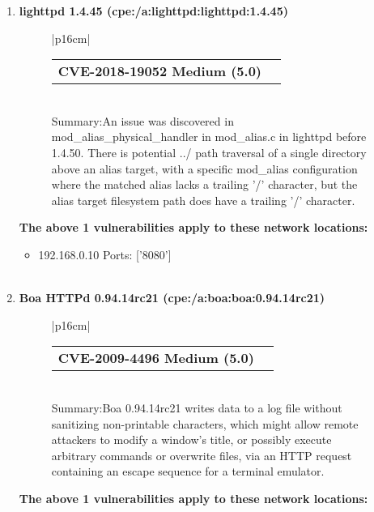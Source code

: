 \documentclass{article}
\begin{document}
\begin{enumerate}[wide, labelwidth=!, labelindent=0pt,
                        label=\textbf{\large \arabic{enumi} \large}]
                         \begin{itemize}
\item 192.168.0.10 Ports: ['3306']
\\ \\ 
 \end{itemize}
\item \textbf{\large lighttpd 1.4.45 (cpe:/a:lighttpd:lighttpd:1.4.45)  \large}\begin{figure}[h!]
\begin{tabular}{|p{16cm}|} \begin{tabular}{@{}p{15cm}>{\raggedleft\arraybackslash}
                           p{0.5cm}@{}}\textbf{CVE-2018-19052 Medium (5.0)} & \href{https://nvd.nist.gov/vuln/detail/CVE-2018-19052}{\large \faicon{link}}\end{tabular}\\
 Summary:An issue was discovered in mod\_alias\_physical\_handler in mod\_alias.c in lighttpd before 1.4.50. There is potential ../ path traversal of a single directory above an alias target, with a specific mod\_alias configuration where the matched alias lacks a trailing '/' character, but the alias target filesystem path does have a trailing '/' character.\\ \hline \end{tabular}  \end{figure}
\FloatBarrier
\textbf{The above 1 vulnerabilities apply to these network locations:}

                         \begin{itemize}
\item 192.168.0.10 Ports: ['8080']
\\ \\ 
 \end{itemize}
\item \textbf{\large Boa HTTPd 0.94.14rc21 (cpe:/a:boa:boa:0.94.14rc21)  \large}\begin{figure}[h!]
\begin{tabular}{|p{16cm}|} \begin{tabular}{@{}p{15cm}>{\raggedleft\arraybackslash}
                           p{0.5cm}@{}}\textbf{CVE-2009-4496 Medium (5.0)} & \href{https://nvd.nist.gov/vuln/detail/CVE-2009-4496}{\large \faicon{link}}\end{tabular}\\
 Summary:Boa 0.94.14rc21 writes data to a log file without sanitizing non-printable characters, which might allow remote attackers to modify a window's title, or possibly execute arbitrary commands or overwrite files, via an HTTP request containing an escape sequence for a terminal emulator.\\ \hline \end{tabular}  \end{figure}
\FloatBarrier
\textbf{The above 1 vulnerabilities apply to these network locations:}


\end{enumerate}
\end{document}
